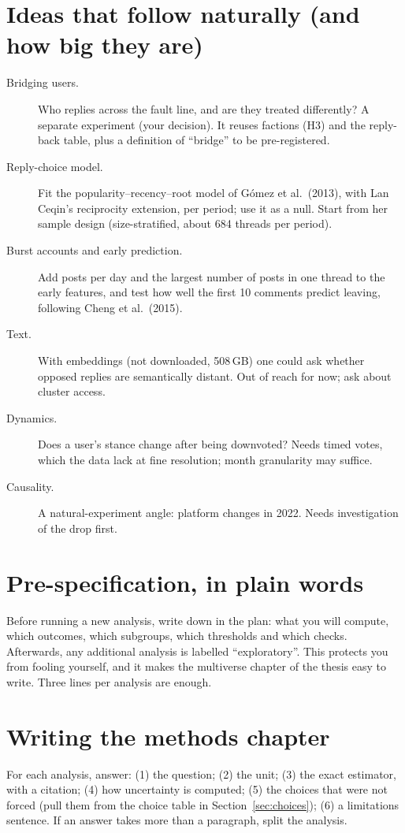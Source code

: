 \section{Ideas that follow naturally (and how big they are)}
\begin{description}
  \item[Bridging users.] Who replies across the fault line, and are they treated differently? A separate experiment (your decision). It reuses factions (H3) and the reply-back table, plus a definition of ``bridge'' to be pre-registered.
  \item[Reply-choice model.] Fit the popularity--recency--root model of G\'omez et al.\ (2013), with Lan Ceqin's reciprocity extension, per period; use it as a null. Start from her sample design (size-stratified, about 684 threads per period).
  \item[Burst accounts and early prediction.] Add posts per day and the largest number of posts in one thread to the early features, and test how well the first 10 comments predict leaving, following Cheng et al.\ (2015).
  \item[Text.] With embeddings (not downloaded, 508\,GB) one could ask whether opposed replies are semantically distant. Out of reach for now; ask about cluster access.
  \item[Dynamics.] Does a user's stance change after being downvoted? Needs timed votes, which the data lack at fine resolution; month granularity may suffice.
  \item[Causality.] A natural-experiment angle: platform changes in 2022. Needs investigation of the drop first.
\end{description}

\section{Pre-specification, in plain words}
Before running a new analysis, write down in the plan: what you will compute, which outcomes, which subgroups, which thresholds and which checks. Afterwards, any additional analysis is labelled ``exploratory''. This protects you from fooling yourself, and it makes the multiverse chapter of the thesis easy to write. Three lines per analysis are enough.

\section{Writing the methods chapter}
For each analysis, answer: (1) the question; (2) the unit; (3) the exact estimator, with a citation; (4) how uncertainty is computed; (5) the choices that were not forced (pull them from the choice table in Section~\ref{sec:choices}); (6) a limitations sentence. If an answer takes more than a paragraph, split the analysis.

